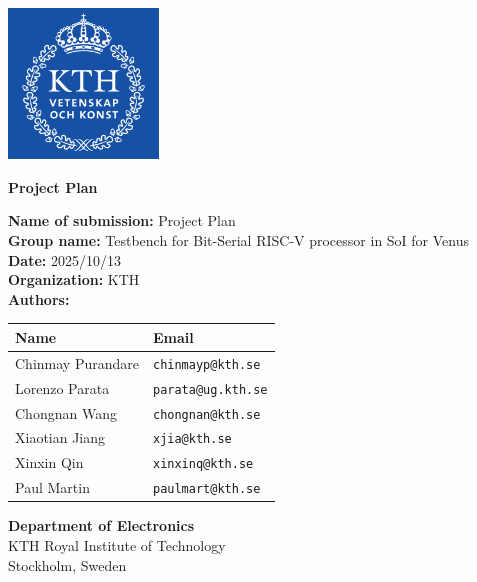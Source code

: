 \documentclass[10pt]{article}
\begin{document}
\begin{titlepage}
\centering
\vspace*{2cm}
\includegraphics[width=0.3\textwidth]{image.png}
\vspace{1cm}

{\Huge\bfseries Project Plan\par}
\vspace{2cm}

\begin{flushleft}
\textbf{Name of submission:} Project Plan\\[0.5em]
\textbf{Group name:} Testbench for Bit-Serial RISC-V processor in SoI for Venus\\[0.5em]
\textbf{Date:} 2025/10/13\\[0.5em]
\textbf{Organization:} KTH\\[1.5em]
\textbf{Authors:}\\[0.5em]
\begin{center}
\begin{tabular}{p{5cm}p{6cm}}
\toprule
\textbf{Name} & \textbf{Email} \\
\midrule
Chinmay Purandare & \texttt{chinmayp@kth.se} \\
Lorenzo Parata & \texttt{parata@ug.kth.se} \\
Chongnan Wang & \texttt{chongnan@kth.se} \\
Xiaotian Jiang & \texttt{xjia@kth.se} \\
Xinxin Qin & \texttt{xinxinq@kth.se} \\
Paul Martin & \texttt{paulmart@kth.se} \\
\bottomrule
\end{tabular}
\end{center}
\vspace{1em}
\end{flushleft}

\vfill
\begin{flushright}
\textbf{Department of Electronics}\\
KTH Royal Institute of Technology\\
Stockholm, Sweden
\end{flushright}
\end{titlepage}
\end{document}
